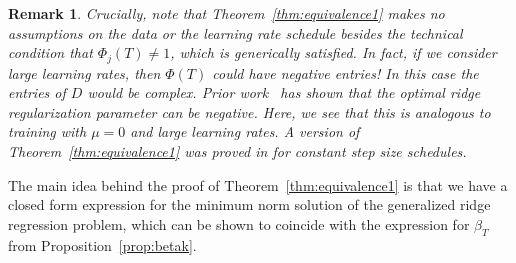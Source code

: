 \documentclass[11pt]{article}
\newtheorem{remark}{Remark}
\begin{document}
\begin{remark}
Crucially, note that Theorem~\ref{thm:equivalence1} makes no assumptions on the data or the learning rate schedule besides the technical condition that $\Phi_j(T) \ne 1$, which is generically satisfied.
In fact, if we consider large learning rates, then $\Phi(T)$ could have negative entries! In this case the entries of $D$ would be complex. Prior work~\cite{yilmaz2022regularization} has shown that the optimal ridge regularization parameter can be negative. Here, we see that this is analogous to training with $\mu = 0$ and large learning rates.
A version of Theorem~\ref{thm:equivalence1} was proved in \cite[Lemma 3]{ali2019continuous} for constant step size schedules.
\end{remark}

The main idea behind the proof of Theorem~\ref{thm:equivalence1} is that we have a closed form expression for the minimum norm solution of the generalized ridge regression problem, which can be shown to coincide with the expression for $\beta_T$ from Proposition~\ref{prop:betak}.
\end{document}
